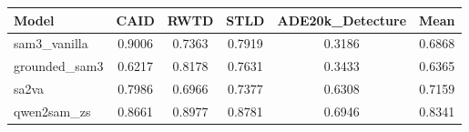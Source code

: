 \begin{tabular}{lccccc}
\toprule
Model & CAID & RWTD & STLD & ADE20k_Detecture & Mean \\ 
\midrule
sam3\_vanilla & 0.9006 & 0.7363 & 0.7919 & 0.3186 & 0.6868 \\
grounded\_sam3 & 0.6217 & 0.8178 & 0.7631 & 0.3433 & 0.6365 \\
sa2va & 0.7986 & 0.6966 & 0.7377 & 0.6308 & 0.7159 \\
qwen2sam\_zs & 0.8661 & 0.8977 & 0.8781 & 0.6946 & 0.8341 \\
\bottomrule
\end{tabular}
